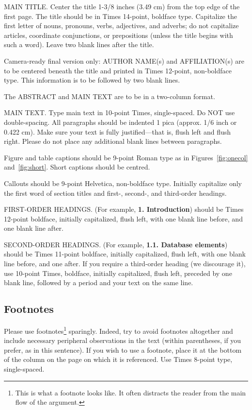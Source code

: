 \documentclass[10pt,twocolumn,letterpaper]{article}
\begin{document}
MAIN TITLE. Center the title 1-3/8 inches (3.49 cm) from the top edge of the first page. The title should be in Times 14-point, boldface type. Capitalize the first letter of nouns, pronouns, verbs, adjectives, and adverbs; do not capitalize articles, coordinate conjunctions, or prepositions (unless the title begins with such a word). Leave two blank lines after the title.

Camera-ready final version only: AUTHOR NAME(s) and AFFILIATION(s) are to be centered beneath the title and printed in Times 12-point, non-boldface type. This information is to be followed by two blank lines.

The ABSTRACT and MAIN TEXT are to be in a two-column format.

MAIN TEXT. Type main text in 10-point Times, single-spaced. Do NOT use double-spacing. All paragraphs should be indented 1 pica (approx. 1/6 inch or 0.422 cm). Make sure your text is fully justified---that is, flush left and flush right. Please do not place any additional blank lines between paragraphs.

Figure and table captions should be 9-point Roman type as in Figures~\ref{fig:onecol} and~\ref{fig:short}. Short captions should be centred.

\noindent Callouts should be 9-point Helvetica, non-boldface type. Initially capitalize only the first word of section titles and first-, second-, and third-order headings.

FIRST-ORDER HEADINGS. (For example, {\large \bf 1. Introduction}) should be Times 12-point boldface, initially capitalized, flush left, with one blank line before, and one blank line after.

SECOND-ORDER HEADINGS. (For example, { \bf 1.1. Database elements}) should be Times 11-point boldface, initially capitalized, flush left, with one blank line before, and one after. If you require a third-order heading (we discourage it), use 10-point Times, boldface, initially capitalized, flush left, preceded by one blank line, followed by a period and your text on the same line.

\subsection{Footnotes}

Please use footnotes\footnote {This is what a footnote looks like. It often distracts the reader from the main flow of the argument.} sparingly. Indeed, try to avoid footnotes altogether and include necessary peripheral observations in the text (within parentheses, if you prefer, as in this sentence). If you wish to use a footnote, place it at the bottom of the column on the page on which it is referenced. Use Times 8-point type, single-spaced.
\end{document}

